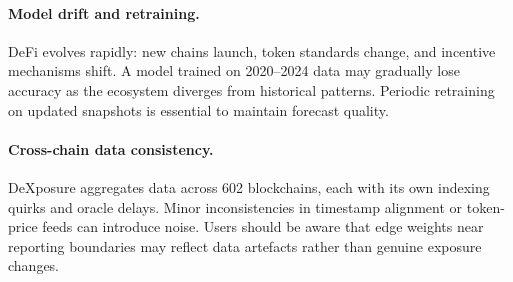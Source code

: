 \paragraph{Model drift and retraining.}
DeFi evolves rapidly: new chains launch, token standards change, and incentive mechanisms shift. A model trained on 2020--2024 data may gradually lose accuracy as the ecosystem diverges from historical patterns. Periodic retraining on updated snapshots is essential to maintain forecast quality.

\paragraph{Cross-chain data consistency.}
DeXposure aggregates data across 602 blockchains, each with its own indexing quirks and oracle delays. Minor inconsistencies in timestamp alignment or token-price feeds can introduce noise. Users should be aware that edge weights near reporting boundaries may reflect data artefacts rather than genuine exposure changes.
